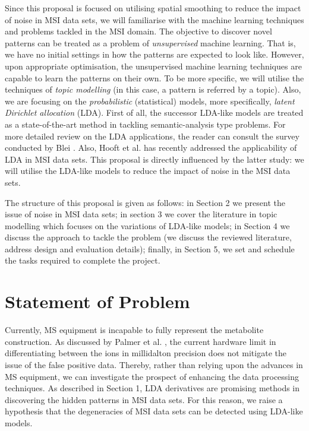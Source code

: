 \documentclass{mprop}
\begin{document}
\par Since this proposal is focused on utilising spatial smoothing to reduce the impact of noise in MSI data sets, we will familiarise with the machine learning techniques and problems tackled in the MSI domain. The objective to discover novel patterns can be treated as a problem of \textit{unsupervised} machine learning. That is, we have no initial settings in how the patterns are expected to look like. However, upon appropriate optimisation, the unsupervised machine learning techniques are capable to learn the patterns on their own. To be more specific, we will utilise the techniques of \textit{topic modelling} (in this case, a pattern is referred by a topic). Also, we are focusing on the \textit{probabilistic} (statistical) models, more specifically, \textit{latent Dirichlet allocation} (LDA). First of all, the successor LDA-like models are treated as a state-of-the-art method in tackling semantic-analysis type problems. For more detailed review on the LDA applications, the reader can consult the survey conducted by Blei \cite{blei_2012}. Also, Hooft et al. \cite{hooft} has recently addressed the applicability of LDA in MSI data sets. This proposal is directly influenced by the latter study: we will utilise the LDA-like models to reduce the impact of noise in the MSI data sets.  

\par The structure of this proposal is given as follows: in Section 2 we present the issue of noise in MSI data sets; in section 3 we cover the literature in topic modelling which focuses on the variations of LDA-like models; in Section 4 we discuss the approach to tackle the problem (we discuss the reviewed literature, address design and evaluation details); finally, in Section 5, we set and schedule the tasks required to complete the project.

\section{Statement of Problem}

\par Currently, MS equipment is incapable to fully represent the metabolite construction. As discussed by Palmer et al. \cite{palmer},  the current hardware limit in differentiating between the ions in millidalton precision does not mitigate the issue of the false positive data. Thereby, rather than relying upon the advances in MS equipment, we can investigate the prospect of enhancing the data processing techniques. As described in Section 1, LDA derivatives are promising methods in discovering the hidden patterns in MSI data sets. For this reason, we raise a hypothesis that the degeneracies of MSI data sets can be detected using LDA-like models.   
\end{document}
